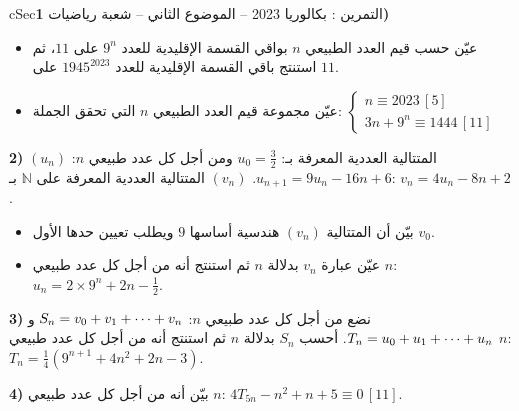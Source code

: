 \documentclass[12pt,a4paper]{article}
\newenvironment{BOX}[2]{\begin{otherlanguage}{english}\begin{arbox}{#1}{#2}}{\end{arbox}\end{otherlanguage}}
\newcounter{exo}
\newenvironment{tamrin}[1]{\stepcounter{exo}\begin{BOX}{cSec}{التمرين \theexo: #1}}{\end{BOX}}
\renewcommand{\cdots}{\mathinner{\cdotp\cdotp\cdotp}}
\newcommand{\N}{\mathbb{N}}
\newenvironment{sq}{\begin{itemize}[leftmargin=2.4em,itemsep=3pt]}{\end{itemize}}
\newcommand{\qa}{\item[(أ)]}\newcommand{\qb}{\item[(ب)]}\newcommand{\qc}{\item[(جـ)]}\newcommand{\qd}{\item[(د)]}\newcommand{\qe}{\item[(هـ)]}
\begin{document}
\begin{tamrin}{بكالوريا 2023 -- الموضوع الثاني -- شعبة رياضيات}
\textbf{1)}
\begin{sq}
\qa عيّن حسب قيم العدد الطبيعي $n$ بواقي القسمة الإقليدية للعدد $9^n$ على $11$، ثم استنتج باقي القسمة الإقليدية للعدد $1945^{2023}$ على $11$.
\qb عيّن مجموعة قيم العدد الطبيعي $n$ التي تحقق الجملة:
$\begin{cases}n\equiv2023\,[5]\\ 3n+9^n\equiv1444\,[11]\end{cases}$
\end{sq}
\textbf{2)} $(u_n)$ المتتالية العددية المعرفة بـ: $u_0=\frac32$ ومن أجل كل عدد طبيعي $n$: $u_{n+1}=9u_n-16n+6$.
$(v_n)$ المتتالية العددية المعرفة على $\N$ بـ: $v_n=4u_n-8n+2$.
\begin{sq}
\qa بيّن أن المتتالية $(v_n)$ هندسية أساسها $9$ ويطلب تعيين حدها الأول $v_0$.
\qb عيّن عبارة $v_n$ بدلالة $n$ ثم استنتج أنه من أجل كل عدد طبيعي $n$: $u_n=2\times9^n+2n-\frac12$.
\end{sq}
\textbf{3)} نضع من أجل كل عدد طبيعي $n$: $S_n=v_0+v_1+\cdots+v_n$ و $T_n=u_0+u_1+\cdots+u_n$.
أحسب $S_n$ بدلالة $n$ ثم استنتج أنه من أجل كل عدد طبيعي $n$: $T_n=\frac14\left(9^{n+1}+4n^2+2n-3\right)$.

\textbf{4)} بيّن أنه من أجل كل عدد طبيعي $n$: $4T_{5n}-n^2+n+5\equiv0\,[11]$.
\end{tamrin}
\end{document}
